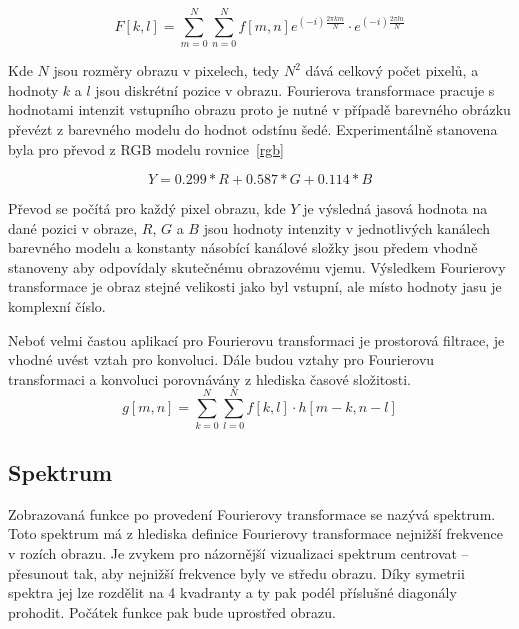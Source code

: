\documentclass[11pt,a4paper]{article}
\begin{document}
\begin{equation}
F[k,l] = \sum_{m=0}^{N}{\sum_{n=0}^{N}{f[m,n]e^{(-i)\frac{2\pi km}{N}}\cdot e^{(-i)\frac{2\pi ln}{N}}}}
\label{dft}
\end{equation}

Kde $N$ jsou rozměry obrazu v pixelech, tedy $N^2$ dává celkový počet pixelů, a hodnoty $k$ a $l$ 
jsou diskrétní pozice v obrazu. Fourierova transformace pracuje s hodnotami intenzit vstupního obrazu
proto je nutné v případě barevného obrázku převézt z barevného modelu do hodnot odstínu šedé. Experimentálně
stanovena byla pro převod z RGB modelu rovnice~\ref{rgb}

\begin{equation}
Y = 0.299*R + 0.587*G + 0.114*B
\label{rgb}
\end{equation}

Převod se počítá pro každý pixel obrazu, kde $Y$ je výsledná jasová hodnota na dané pozici v obraze,
$R$, $G$ a $B$ jsou hodnoty intenzity v jednotlivých kanálech barevného modelu a konstanty násobící
kanálové složky jsou předem vhodně stanoveny aby odpovídaly skutečnému obrazovému vjemu.
Výsledkem Fourierovy transformace je obraz stejné velikosti jako byl vstupní, ale místo hodnoty jasu
je komplexní číslo.

Neboť velmi častou aplikací pro Fourierovu transformaci je prostorová filtrace, je vhodné uvést vztah 
pro konvoluci. Dále budou vztahy pro Fourierovu transformaci a konvoluci porovnávány z hlediska 
časové složitosti.
\begin{equation}
g[m,n] = \sum_{k=0}^{N}{\sum_{l=0}^{N}{f[k,l]\cdot h[m-k, n-l]}}
\label{konvoluce}
\end{equation}

\subsection{Spektrum}
Zobrazovaná funkce po provedení Fourierovy transformace se nazývá spektrum.  Toto spektrum má z hlediska 
definice Fourierovy transformace nejnižší frekvence v rozích obrazu. Je zvykem
pro názornější vizualizaci spektrum centrovat -- přesunout tak, aby nejnižší frekvence byly ve středu obrazu.
Díky symetrii spektra jej lze rozdělit na 4 kvadranty a ty pak podél příslušné diagonály prohodit. Počátek
funkce pak bude uprostřed obrazu.
\end{document}
